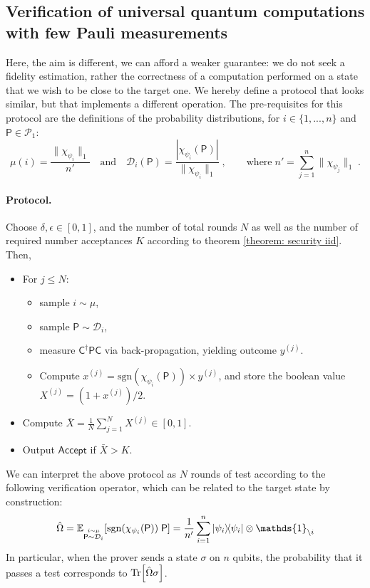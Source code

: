 \documentclass[11pt]{article}
\renewcommand{\P}{\mathsf{P}}
\newcommand{\Pauli}{\mathcal{P}}
\newcommand{\C}{\mathsf{C}}
\begin{document}
\subsection{Verification of universal quantum computations with few Pauli measurements}
Here, the aim is different, we can afford a weaker guarantee: we do not seek a fidelity estimation, rather the correctness of a computation performed on a state that we wish to be close to the target one. We hereby define a protocol that looks similar, but that implements a different operation.
The pre-requisites for this protocol are the definitions of the probability distributions, for $i\in\{1, ..., n\}$ and $\P\in\Pauli_1$:
\begin{equation}
    \mu(i) = \dfrac{\|\chi_{\psi_i}\|_1}{n'} \quad \text{and} \quad \mathcal D_i(\P) = \dfrac{|\chi_{\psi_i}(\P)|}{\|\chi_{\psi_i}\|_1}\; ,\qquad \text{where}\; n' = \sum_{j=1}^n \|\chi_{\psi_j}\|_1\; .
\end{equation}

\paragraph{Protocol.}
Choose $\delta, \epsilon\in[0,1]$, and the number of total rounds $N$ as well as the number of required number acceptances $K$ according to theorem \ref{theorem: security iid}.
Then,
\begin{itemize}
    \item
    For $j\leq N$:
    \begin{itemize}
        \item 
        sample $i\sim \mu$,
        \item 
        sample $\P \sim \mathcal D_i$,
        \item 
        measure $\C^\dagger\P\C$ via back-propagation, yielding outcome $y^{(j)}$.
        \item 
        Compute $x^{(j)}=\mathrm{sgn}(\chi_{\psi_i}(\P))\times y^{(j)}$, and store the boolean value  $X^{(j)}=(1+x^{(j)})/2$.
    \end{itemize}
    \item Compute $\bar X = \frac{1}{N}\sum_{j=1}^N X^{(j)} \in [0, 1]$.
    \item Output $\mathsf{Accept}$ if $\bar X > K$.
\end{itemize}
We can interpret the above protocol as $N$ rounds of test according to the following verification operator, which can be related to the target state by construction:
\begin{equation}
    \hat\Omega = \mathbb E_{
    \stackrel{i\sim\mu}{\P\sim\mathcal D_i}    
    }[\mathrm{sgn}(\chi_{\psi_i}(\P)) \; \P] = \dfrac{1}{n'}\sum_{i=1}^n \ketbra{\psi_i}\otimes \mathds{1}_{\backslash i}
\end{equation}
In particular, when the prover sends a state $\sigma$ on $n$ qubits, the probability that it passes a test corresponds to $\Tr[\hat\Omega\sigma]$.
\end{document}
